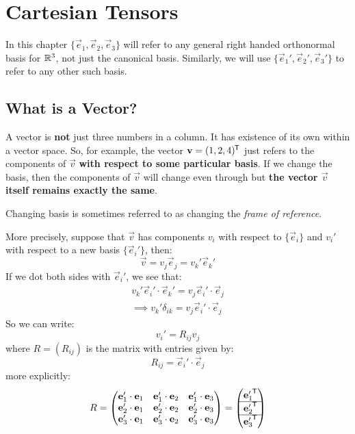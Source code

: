 \documentclass[../main.tex]{subfiles}
\begin{document}
\chapter{Cartesian Tensors}
\begin{remark}[Notation]
  In this chapter $\{\vec{e}_1, \vec{e}_2, \vec{e}_3\}$ will refer to any general right handed orthonormal basis for $\mathbb{R}^3$, not just the canonical basis.
  Similarly, we will use $\{\vec{e}_1', \vec{e}_2', \vec{e}_3'\}$ to refer to any other such basis.
\end{remark}
\section{What is a Vector?}
A vector is \textbf{not} just three numbers in a column.
It has existence of its own within a vector space.
So, for example, the vector $\mathbf{\bm{v}} = (1, 2, 4)^{{\mkern-1.5mu\mathsf{T}}}$ just refers to the components of $\vec{v}$ \textbf{with respect to some particular basis}.
If we change the basis, then the components of $\vec{v}$ will change even through but \textbf{the vector $\vec{v}$ itself remains exactly the same}.
\begin{remark}[Nomenclature]
  Changing basis is sometimes referred to as changing the \textit{frame of reference}.
\end{remark}
More precisely, suppose that $\vec{v}$ has components $v_i$ with respect to $\{\vec{e}_i\}$ and $v_i'$ with respect to a new basis $\{\vec{e}_i'\}$, then:
\[
  \vec{v} = v_j \vec{e}_j = v_k' \vec{e}_k'
\]
If we dot both sides with $\vec{e}_i'$, we see that:
\begin{align*}
  v_k' \vec{e}_i' \cdot \vec{e}_k' = v_j \vec{e}_i' \cdot \vec{e}_j \\
  \implies v_k' \delta_{i k} = v_j \vec{e}_i' \cdot \vec{e}_j
\end{align*}
So we can write:
\begin{equation}
  v_i' = R_{i j}v_j \label{vectorTransform}
\end{equation}
where $R = (R_{i j})$ is the matrix with entries given by:
\[
  R_{ij} = \vec{e}_i' \cdot \vec{e}_j
\]
more explicitly:
\[
  R = \begin{pmatrix}
  \mathbf{\bm{e}}_1' \cdot \mathbf{\bm{e}}_1 & \mathbf{\bm{e}}_1' \cdot \mathbf{\bm{e}}_2 & \mathbf{\bm{e}}'_1 \cdot \mathbf{\bm{e}}_3 \\
  \mathbf{\bm{e}}_2' \cdot \mathbf{\bm{e}}_1 & \mathbf{\bm{e}}_2' \cdot \mathbf{\bm{e}}_2 & \mathbf{\bm{e}}'_2 \cdot \mathbf{\bm{e}}_3 \\
  \mathbf{\bm{e}}_3' \cdot \mathbf{\bm{e}}_1 & \mathbf{\bm{e}}_3' \cdot \mathbf{\bm{e}}_2 & \mathbf{\bm{e}}'_3 \cdot \mathbf{\bm{e}}_3 \\
  \end{pmatrix} = \begin{pmatrix}
  {\mathbf{\bm{e}}_1'}^{{\mkern-1.5mu\mathsf{T}}} \\
  \hline
  {\mathbf{\bm{e}}_2'}^{{\mkern-1.5mu\mathsf{T}}} \\
  \hline
  {\mathbf{\bm{e}}_3'}^{{\mkern-1.5mu\mathsf{T}}} \\
  \end{pmatrix}
\]
\end{document}

